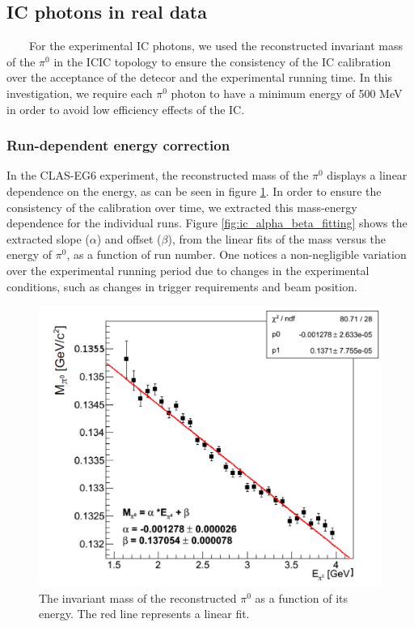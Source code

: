 \subsection{IC photons in real data} ~~~~For the experimental IC photons, we 
used the reconstructed invariant mass of the $\pi^{0}$ in the ICIC topology to 
ensure the consistency of the IC calibration over the acceptance of the detecor 
and the experimental running time. In this investigation, we require each 
$\pi^{0}$ photon to have a minimum energy of 500 MeV in order to avoid low 
efficiency effects of the IC. 

\subsubsection{Run-dependent energy correction}

In the CLAS-EG6 experiment, the reconstructed mass of the $\pi^{0}$ displays a linear dependence on the energy, as can be seen in figure \ref{fig:M_E_pi0_before_corrections}. In order to ensure the consistency of the calibration over time, we extracted this mass-energy dependence for the individual runs. Figure \ref{fig:ic_alpha_beta_fitting} shows the extracted slope ($\alpha$) and offset ($\beta$), from the linear fits of the mass versus the energy of $\pi^{0}$, as a function of run number. One notices a non-negligible variation over the experimental running period due to changes in the experimental conditions, such as changes in trigger requirements and beam position.\\

\begin{figure}[tbp]
\centering
\includegraphics[scale=0.25]{fig_simulation/M_E_pi0_before_corrections.png}
\caption{The invariant mass of the reconstructed $\pi^{0}$ as a function of its energy. The red line represents a linear fit.} 
\label{fig:M_E_pi0_before_corrections}
\end{figure}

